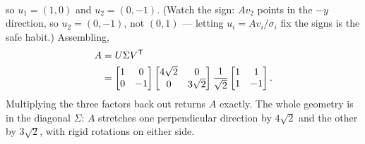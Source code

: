 {\[\begin{aligned}
   \end{aligned}
\]
so $u_1=(1,0)$ and $u_2=(0,-1)$. (Watch the sign: $Av_2$ points in the $-y$ direction, so $u_2=(0,-1)$, not $(0,1)$ --- letting $u_i=Av_i/\sigma_i$ fix the signs is the safe habit.) Assembling,
\[
   \begin{aligned}
   A&=U\Sigma V^{\mathsf T}\\
    &=\begin{bmatrix} 1 & 0\\ 0 & -1\end{bmatrix}
    \begin{bmatrix} 4\sqrt2 & 0\\ 0 & 3\sqrt2\end{bmatrix}
    \frac{1}{\sqrt2}\begin{bmatrix} 1 & 1\\ 1 & -1\end{bmatrix}.
   \end{aligned}
\]
Multiplying the three factors back out returns $A$ exactly. The whole geometry is in the diagonal $\Sigma$: $A$ stretches one perpendicular direction by $4\sqrt2$ and the other by $3\sqrt2$, with rigid rotations on either side.}


